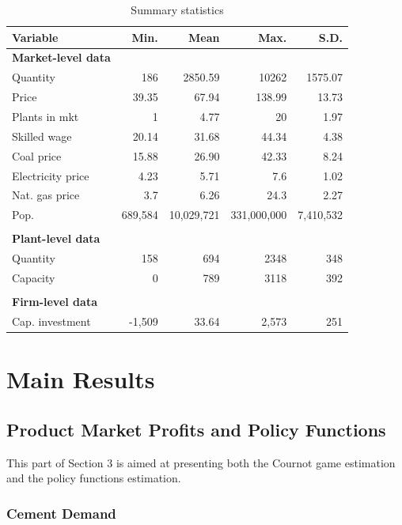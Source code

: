 \documentclass[12pt]{article}
\begin{document}
\begin{table}[ht!]
\centering
\begin{tabular}{lrrrr}
\hline \hline
Variable & Min. & Mean & Max. & S.D. \\ \hline
\textbf{Market-level data} & \textbf{} & \textbf{} & \textbf{} & \textbf{} \\
Quantity & 186 & 2850.59 & 10262 & 1575.07 \\
Price & 39.35 & 67.94 & 138.99 & 13.73 \\
Plants in mkt & 1 & 4.77 & 20 & 1.97 \\
Skilled wage & 20.14 & 31.68 & 44.34 & 4.38 \\
Coal price & 15.88 & 26.90 & 42.33 & 8.24 \\
Electricity price & 4.23 & 5.71 & 7.6 & 1.02 \\
Nat. gas price & 3.7 & 6.26 & 24.3 & 2.27 \\
Pop. & 689,584 & 10,029,721 & 331,000,000 & 7,410,532 \\
 &  &  &  &  \\
\textbf{Plant-level data} & \textbf{} & \textbf{} & \textbf{} & \textbf{} \\
Quantity & 158 & 694 & 2348 & 348 \\
Capacity & 0 & 789 & 3118 & 392 \\
 &  &  &  &  \\
\textbf{Firm-level data} & \textbf{} & \textbf{} & \textbf{} & \textbf{} \\
Cap. investment & -1,509 & 33.64 & 2,573 & 251 \\ \hline \hline
\end{tabular}
\caption{Summary statistics}
\label{tab:summstat}
\end{table}


\section{Main Results}

\subsection{Product Market Profits and Policy Functions}

This part of Section 3 is aimed at presenting both the Cournot game estimation and the policy functions estimation.

\subsubsection{Cement Demand}
\end{document}
